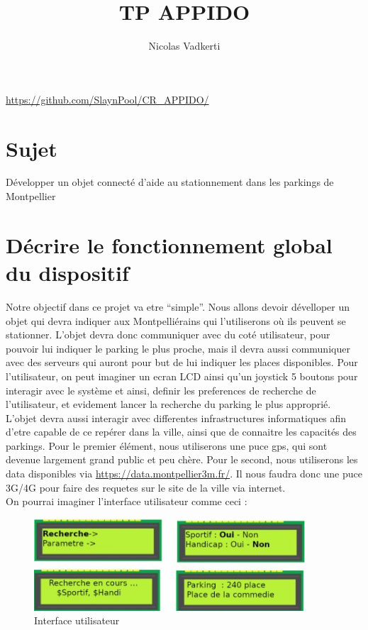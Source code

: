 \documentclass[10pt,a4paper]{article}
\title{TP APPIDO}
\author{Nicolas Vadkerti}
\begin{document}
\maketitle


\url{https://github.com/SlaynPool/CR_APPIDO/}

\section{Sujet}
Développer un objet connecté d'aide au stationnement dans les parkings de Montpellier
\section{Décrire le fonctionnement global du dispositif}
Notre objectif dans ce projet va etre ``simple''. Nous allons devoir dévelloper un objet qui devra indiquer aux Montpelliérains qui l'utiliserons où ils peuvent se stationner. 
L'objet devra donc communiquer avec du coté utilisateur, pour pouvoir lui indiquer le parking le plus proche, mais il devra aussi communiquer avec des serveurs qui auront pour but de lui indiquer les places disponibles.
Pour l'utilisateur, on peut imaginer un ecran LCD ainsi qu'un joystick 5 boutons pour interagir avec le système et ainsi, definir les preferences de recherche de l'utilisateur, et evidement lancer la recherche du parking le plus approprié.\\
L'objet devra aussi interagir avec differentes infrastructures informatiques afin d'etre capable de ce repérer dans la ville, ainsi que de connaitre les capacités des parkings. Pour le premier élément, nous utiliserons une puce gps, qui sont devenue largement grand public et peu chère. Pour le second, nous utiliserons les data disponibles via  \url{https://data.montpellier3m.fr/}. Il nous faudra donc une puce 3G/4G pour faire des requetes sur le site de la ville via internet.\\

On pourrai imaginer l'interface utilisateur comme ceci :\\
\begin{figure}[h!]
\centering
\includegraphics[width=0.9\textwidth]{UI.jpg}
\caption{Interface utilisateur}
\label{fig:universe}
\end{figure}
\end{document}
